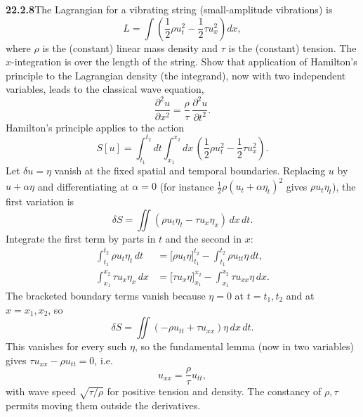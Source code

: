 \par\bigskip
\noindent\textbf{22.2.8}\quad The Lagrangian for a vibrating
string (small-amplitude vibrations) is
\[
L=\int\left(\frac{1}{2}\rho u_{t}^{2}
-\frac{1}{2}\tau u_{x}^{2}\right)dx,
\]
where $\rho$ is the (constant) linear mass density and $\tau$ is
the (constant) tension. The $x$-integration is over the length
of the string. Show that application of Hamilton's principle to
the Lagrangian density (the integrand), now with two independent
variables, leads to the classical wave equation,
\[
\frac{\partial^{2}u}{\partial x^{2}}
=\frac{\rho}{\tau}\,\frac{\partial^{2}u}{\partial t^{2}}.
\]
\solution
Hamilton's principle applies to the action
\[
S[u]=\int_{t_1}^{t_2}dt\int_{x_1}^{x_2}dx\,
\left(\frac12\rho u_t^2-\frac12\tau u_x^2\right).
\]
Let $\delta u=\eta$ vanish at the fixed spatial and temporal
boundaries. Replacing $u$ by $u+\alpha\eta$ and differentiating at
$\alpha=0$ (for instance $\frac12\rho(u_t+\alpha\eta_t)^2$ gives
$\rho u_t\eta_t$), the first variation is
\[
\delta S=\iint(\rho u_t\eta_t-\tau u_x\eta_x)\,dx\,dt.
\]
Integrate the first term by parts in $t$ and the second in $x$:
\[
\begin{aligned}
\int_{t_1}^{t_2}\rho u_t\eta_t\,dt
&=\bigl[\rho u_t\eta\bigr]_{t_1}^{t_2}
-\int_{t_1}^{t_2}\rho u_{tt}\eta\,dt,\\
\int_{x_1}^{x_2}\tau u_x\eta_x\,dx
&=\bigl[\tau u_x\eta\bigr]_{x_1}^{x_2}
-\int_{x_1}^{x_2}\tau u_{xx}\eta\,dx.
\end{aligned}
\]
The bracketed boundary terms vanish because $\eta=0$ at $t=t_1,t_2$
and at $x=x_1,x_2$, so
\[
\delta S=\iint(-\rho u_{tt}+\tau u_{xx})\eta\,dx\,dt.
\]
This vanishes for every such $\eta$, so the fundamental lemma (now in
two variables) gives $\tau u_{xx}-\rho u_{tt}=0$, i.e.
\[
\boxed{u_{xx}=\frac{\rho}{\tau}u_{tt}},
\]
with wave speed $\sqrt{\tau/\rho}$ for positive tension and density.
The constancy of $\rho,\tau$ permits moving them outside the derivatives.


